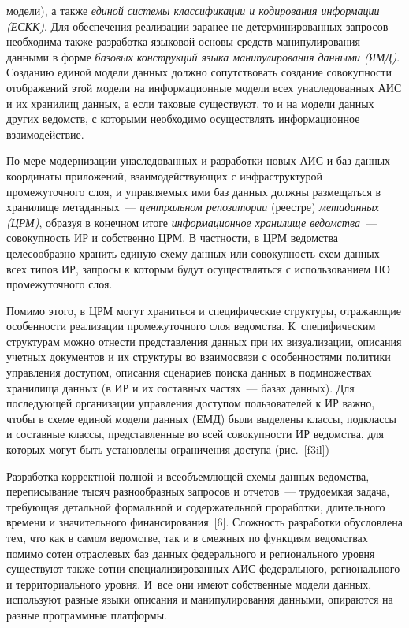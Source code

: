 \begin{multicols}{2}

\noindent
 модели), а также \textit{единой системы классификации и кодирования 
информации (ЕСКК)}. Для обеспечения
 реализации заранее не детерминированных запросов 
необходима также разработка языковой основы средств манипулирования данными в форме 
\textit{базовых конструкций языка манипулирования данными (ЯМД)}. Созданию единой 
модели данных должно сопутствовать создание совокупности отображений этой модели на 
информационные модели всех унас\-ле\-до\-ван\-ных АИС и их хранилищ данных, а если таковые 
существуют, то и на модели данных других ведомств, с которыми необходимо осуществлять 
информационное взаимодействие. 
      
      По мере модернизации унаследованных и разработки новых АИС и баз данных 
координаты приложений, взаимодействующих с инфраструктурой промежуточного слоя, и 
управляемых ими баз\linebreak
 данных должны размещаться в хранилище метаданных~--- 
\textit{центральном репозитории} (реестре) \textit{метаданных (ЦРМ)}, образуя в конечном 
итоге \textit{информационное хранилище ведомства}~--- совокупность ИР и собственно ЦРМ. 
В частности, в ЦРМ ведомства целесообразно хранить единую схему данных или 
совокупность схем данных всех типов ИР, запросы к которым будут осуществляться с 
использованием ПО промежуточного слоя. 
      
      Помимо этого, в ЦРМ могут храниться и специфические структуры, отражающие 
особенности реализации промежуточного слоя ведомства. К~специфическим структурам 
можно отнести пред\-став\-ле\-ния данных при их визуализации, описания учетных документов и 
их структуры во взаимосвязи с особенностями политики управления доступом, описания 
сценариев поиска данных в подмножествах хранилища данных (в ИР и 
их составных частях~--- базах данных). Для последующей организации управления доступом 
пользователей к ИР важно, чтобы в схеме единой модели данных (ЕМД) были выделены классы, подклассы и 
составные классы, представленные во всей совокупности ИР ведомства, для которых могут 
быть установлены ограничения доступа (рис.~\ref{f3il})
      

      
      Разработка корректной полной и всеобъемлющей схемы данных ведомства, 
переписывание тысяч разнообразных запросов и отчетов~--- трудоемкая задача, требующая 
детальной формальной и содержательной проработки, длительного времени и значительного 
финансирования~[6]. Сложность разработки обусловлена тем, что как в самом ведомстве, так 
и в смежных по функциям ведомствах помимо сотен отраслевых баз данных федерального и 
регионального уровня существуют также сотни специализированных АИС федерального, 
регионального и территориального уровня. И~все они имеют собственные модели данных, 
используют разные языки описания и манипулирования данными, опираются на разные 
программные платформы.
      

\end{multicols}
